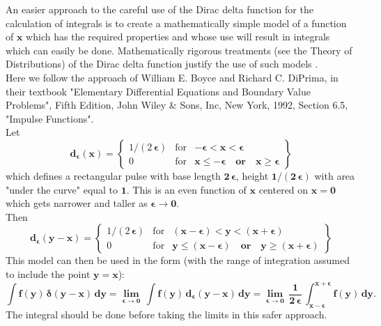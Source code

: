 \documentclass[12pt]{article}
\begin{document}
\noindent An easier approach to the careful use of the Dirac delta function for the
  calculation of integrals is to create a mathematically simple model
  of a function of $\mathbf{x}$ which has the required properties and whose use will
  result in integrals which can easily be done.
Mathematically rigorous treatments (see the Theory of Distributions) of the Dirac delta 
  function justify the use of such models .\\
  
\noindent Here we follow the approach of William E. Boyce and Richard C. DiPrima, in their
  textbook "Elementary Differential Equations and Boundary Value Problems", Fifth Edition,
  John Wiley \& Sons, Inc, New York, 1992, Section 6.5, "Impulse Functions".\\
  
\noindent Let
\begin{equation}
\mathbf{d_{\boldsymbol{\epsilon}}(x)} = 
 \left\{ \begin{array}{ccl}
  1/(2\,\boldsymbol{\epsilon}) & \text{for} & \mathbf{-\boldsymbol{\epsilon} < x < \boldsymbol{\epsilon}} \\
  0 & \text{for} & \mathbf{x \leq -\boldsymbol{\epsilon} \quad \text{or} \quad x \geq \boldsymbol{\epsilon} }
  \end{array} \right\}
\end{equation}
which defines a rectangular pulse with base length $\mathbf{2\,\boldsymbol{\epsilon}}$,
  height $\mathbf{1/(2\,\boldsymbol{\epsilon})}$ with area "under the curve" equal to $\mathbf{1}$.
This is an even function of $\mathbf{x}$ centered on $\mathbf{x=0}$ which gets narrower and
  taller as $\mathbf{\boldsymbol{\epsilon} \rightarrow 0}$.\\
  
\noindent Then
\begin{equation}
\mathbf{d_{\boldsymbol{\epsilon}}(y-x)} = 
 \left\{ \begin{array}{ccl}
  1/(2\,\boldsymbol{\epsilon}) & \text{for} & 
            \mathbf{(x-\boldsymbol{\epsilon}) < y < (x + \boldsymbol{\epsilon})} \\
  0 & \text{for} & \mathbf{y \leq (x -\boldsymbol{\epsilon}) \quad \text{or} \quad
         y \geq (x + \boldsymbol{\epsilon}) }
  \end{array} \right\}
\end{equation}  
\newpage
\noindent This model can then be used in the form (with the range of integration assumed
  to include the point $\mathbf{y=x}$):
\begin{equation}
\mathbf{\int f(y)\,\boldsymbol{\delta}(y-x)\,dy}   = 
  \boldsymbol{\lim_{\epsilon \rightarrow 0}} \, \mathbf{\int f(y)\,d_{\boldsymbol{\epsilon}}(y-x)\,dy } 
  = \boldsymbol{\lim_{\epsilon \rightarrow 0}} \, \mathbf{ \frac{1}{2\,\boldsymbol{\epsilon}} \,
           \int_{x - \boldsymbol{\epsilon}}^{x + \boldsymbol{\epsilon}} f(y)\,dy }.
\end{equation}
The integral should be done before taking the limits in this safer approach.\\
\end{document}
